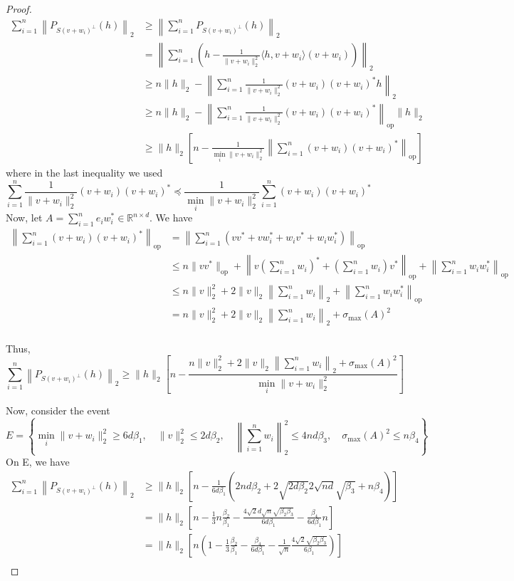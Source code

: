 \begin{proof}
\begin{align*}
\sum_{i=1}^n \left \| P_{S(v+w_i)^\perp}(h)\right \|_2 &\geq \left \|  \sum_{i=1}^n P_{S(v+w_i)^\perp}(h)\right\|_2\\
&= \left \| \sum_{i=1}^n \left(h - \frac{1}{\|v+w_i\|_2^2}\langle h, v+ w_i \rangle (v+ w_i) \right)\right \|_2\\
&\geq n\|h\|_2 - \left \| \sum_{i=1}^n \frac{1}{\|v+w_i\|_2^2} (v+ w_i)(v+ w_i)^* h\right \|_2  \\
&\geq n\|h\|_2 - \left \| \sum_{i=1}^n \frac{1}{\|v+w_i\|_2^2} (v+ w_i)(v+ w_i)^* \right\|_{\text{op}} \|h\|_2\\
& \geq \|h\|_2 \left[n - \frac{1}{\min_{i}\|v+w_i\|_2^2} \left \| \sum_{i=1}^n (v+ w_i)(v+ w_i)^* \right\|_{\text{op}} \right]
\end{align*}
where in the last inequality we used 
\[
\sum_{i=1}^n \frac{1}{\|v+w_i\|_2^2} (v+ w_i)(v+ w_i)^* \preceq \frac{1}{\min_{i}\|v+w_i\|_2^2}  \sum_{i=1}^n (v+ w_i)(v+ w_i)^*
\]
Now, let $A = \sum_{i=1}^n e_i w_i^* \in \mathbb{R}^{n\times d}$. We have  
\begin{align*}
\left \| \sum_{i=1}^n (v+ w_i)(v+ w_i)^* \right\|_{\text{op}} &= \left \| \sum_{i=1}^n (vv^* + vw_i^* + w_i v^* + w_i w_i^*) \right\|_{\text{op}}\\
& \leq n\|vv^*\|_{\text{op}} + \left\| v \left( \sum_{i=1}^n w_i \right)^* +  \left( \sum_{i=1}^n w_i \right)v^* \right\|_{\text{op}} + \left \| \sum_{i=1}^n w_i w_i^* \right\|_{\text{op}}\\
& \leq n \|v\|_2^2 + 2\|v\|_2\left \| \sum_{i=1}^n w_i \right\|_2 + \left \| \sum_{i=1}^n w_i w_i^* \right\|_{\text{op}}\\
& = n \|v\|_2^2 + 2\|v\|_2\left \| \sum_{i=1}^n w_i \right\|_2 + \sigma_{\max}(A)^2\\
\end{align*}

Thus,
\[
\sum_{i=1}^n \left \| P_{S(v+w_i)^\perp}(h)\right \|_2 \geq \|h\|_2\left[n - \frac{n \|v\|_2^2 + 2\|v\|_2\left \| \sum_{i=1}^n w_i \right\|_2 + \sigma_{\max}(A)^2}{\min_{i}\|v+w_i\|_2^2} \right]
\]

Now, consider the event
\[
E = \left\{ \min_{i} \|v+w_i\|_2^2 \geq 6d\beta_1, \quad \|v\|_2^2 \leq 2d\beta_2, \quad \left \| \sum_{i=1}^n w_i \right\|_2^2 \leq 4nd\beta_3, \quad \sigma_{\max}(A)^2 \leq n\beta_4  \right\}
\]
On E, we have
\begin{align*}
\sum_{i=1}^n \left \| P_{S(v+w_i)^\perp}(h)\right \|_2 &\geq \|h\|_2 \left[ n - \frac{1}{6d\beta_1}\left( 2nd\beta_2 + 2\sqrt{2d\beta_2}2\sqrt{nd}\sqrt{\beta_3} + n\beta_4  \right) \right]\\
&= \|h\|_2 \left[n - \frac{1}{3}n \frac{\beta_2}{\beta_1} - \frac{4\sqrt{2}d\sqrt{n} \sqrt{\beta_2\beta_3}}{6d\beta_1}-\frac{\beta_4 }{6d\beta_1}n \right]\\
& = \|h\|_2 \left[n\left(1 - \frac{1}{3} \frac{\beta_2}{\beta_1} - \frac{\beta_4}{6d\beta_1}- \frac{1}{\sqrt{n}}\frac{ 4\sqrt{2} \sqrt{\beta_2\beta_3}}{6\beta_1} \right)\right]\\
\end{align*}


\end{proof}
